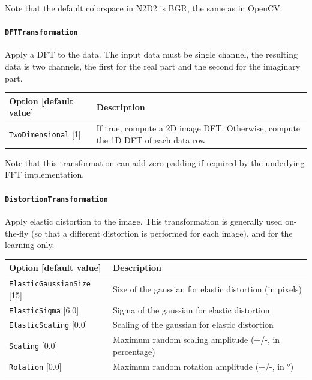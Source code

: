 \documentclass[a4paper,11pt,oneside]{article}
\newcommand{\iponly}{\reversemarginpar
    \marginnote{\color{listletiblue}\normalfont\scriptsize
    {\ttfamily{}\hyperref[sec:N2D2-IP]{\color{listletiblue}N2D2 IP}} \emph{only}}}
\begin{document}
Note that the default colorspace in N2D2 is BGR, the same as in OpenCV.


\paragraph{\texorpdfstring{%
\lstinline[basicstyle=\ttfamily\bfseries]!DFTTransformation!}
{DFTTransformation}}
Apply a DFT to the data.
The input data must be single channel, the resulting data is two channels,
the first for the real part and the second for the imaginary part.

\begin{center}
 \begin{tabular}{| p{5cm} | p{10cm} | }
 \hline
 Option [default value] & Description\\
 \hline\hline
  \lstinline!TwoDimensional! [1] & If true, compute a 2D image DFT. Otherwise,
   compute the 1D DFT of each data row \\
 \hline
\end{tabular}
\end{center}

Note that this transformation can add zero-padding if required by the underlying
 FFT implementation.


\paragraph{\label{par:DistortionTransformation}%
\texorpdfstring{\lstinline[basicstyle=\ttfamily\bfseries]!DistortionTransformation!\protect\iponly}
{DistortionTransformation}}
Apply elastic distortion to the image. This transformation is generally used
on-the-fly (so that a different distortion is performed for each image), and
for the learning only.


\begin{center}
 \begin{tabular}{| p{5cm} | p{10cm} | }
 \hline
 Option [default value] & Description\\
 \hline\hline
  \lstinline!ElasticGaussianSize! [15] & Size of the gaussian for elastic
  distortion (in pixels) \\
  \lstinline!ElasticSigma! [6.0] & Sigma of the gaussian for elastic
  distortion \\
  \lstinline!ElasticScaling! [0.0] & Scaling of the gaussian for elastic
  distortion \\
  \lstinline!Scaling! [0.0] & Maximum random scaling amplitude
  (+/-, in percentage) \\
  \lstinline!Rotation! [0.0] & Maximum random rotation amplitude
  (+/-, in °) \\
 \hline
\end{tabular}
\end{center}
\end{document}
